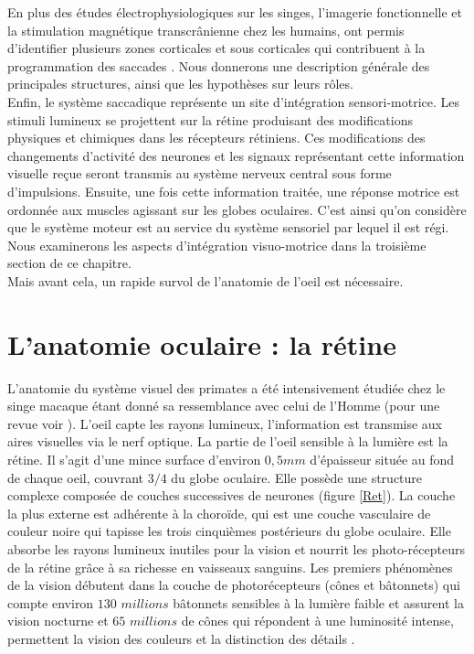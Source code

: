 En plus des études électrophysiologiques sur les singes, l'imagerie fonctionnelle et la stimulation magnétique transcrânienne chez les humains, ont permis d'identifier plusieurs zones corticales et sous corticales qui contribuent à la programmation des saccades \cite{Pierrot:2002}. Nous donnerons une description générale des principales structures, ainsi que les hypothèses sur leurs rôles.\\

Enfin, le système saccadique représente un site d'intégration sensori-motrice. Les stimuli lumineux se projettent sur la rétine produisant des modifications physiques et chimiques dans les récepteurs rétiniens. Ces modifications des changements d'activité des neurones et les signaux représentant cette information visuelle reçue seront transmis au système nerveux central sous forme d'impulsions. Ensuite, une fois cette information traitée, une réponse motrice est ordonnée aux muscles agissant sur les globes oculaires. C'est ainsi qu'on considère que le système moteur est au service du système sensoriel par lequel il est régi. Nous examinerons les aspects d'intégration visuo-motrice dans la troisième section de ce chapitre. \\

Mais avant cela, un rapide survol de l'anatomie de l'oeil est nécessaire.\\

\section{L'anatomie oculaire : la rétine}

L'anatomie du système visuel des primates a été intensivement étudiée chez le singe macaque étant donné sa ressemblance avec celui de l'Homme (pour une revue voir \cite{Leigh:2004}). L'oeil capte les rayons lumineux, l'information est transmise aux aires visuelles via le nerf optique. La partie de l'oeil sensible à la lumière est la rétine. Il s'agit d'une mince surface d'environ $0,5 mm$ d'épaisseur située au fond de chaque oeil, couvrant $3/4$ du globe oculaire. Elle possède une structure complexe composée de couches successives de neurones (figure \ref{Ret}). La couche la plus externe est adhérente à la choroïde, qui est une couche vasculaire de couleur noire qui tapisse les trois cinquièmes postérieurs du globe oculaire. Elle absorbe les rayons lumineux inutiles pour la vision et nourrit les photo-récepteurs de la rétine grâce à sa richesse en vaisseaux sanguins. Les premiers phénomènes de la vision débutent dans la couche de photorécepteurs (cônes et bâtonnets) qui compte environ $130$ $millions$ bâtonnets sensibles à la lumière faible et assurent la vision nocturne et $65$ $millions$ de cônes qui répondent à une luminosité intense, permettent la vision des couleurs et la distinction des détails \cite{Gregory:2000, Sekuler:1990}.\\ 

